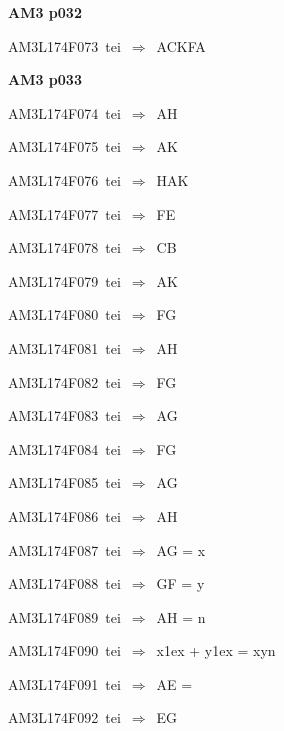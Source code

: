 \par\vfill\eject
{\bf\hfill AM3 p032\hfill\hbox{}}\par\bigskip
{\sixrm AM3L174F073\ {\sixit tei}\ }$\Rightarrow$\ ACKFA\par\smallskip

\par\vfill\eject
{\bf\hfill AM3 p033\hfill\hbox{}}\par\bigskip
{\sixrm AM3L174F074\ {\sixit tei}\ }$\Rightarrow$\ AH\par\smallskip
{\sixrm AM3L174F075\ {\sixit tei}\ }$\Rightarrow$\ AK\par\smallskip
{\sixrm AM3L174F076\ {\sixit tei}\ }$\Rightarrow$\ HAK\par\smallskip
{\sixrm AM3L174F077\ {\sixit tei}\ }$\Rightarrow$\ FE\par\smallskip
{\sixrm AM3L174F078\ {\sixit tei}\ }$\Rightarrow$\ CB\par\smallskip
{\sixrm AM3L174F079\ {\sixit tei}\ }$\Rightarrow$\ AK\par\smallskip
{\sixrm AM3L174F080\ {\sixit tei}\ }$\Rightarrow$\ FG\par\smallskip
{\sixrm AM3L174F081\ {\sixit tei}\ }$\Rightarrow$\ AH\par\smallskip
{\sixrm AM3L174F082\ {\sixit tei}\ }$\Rightarrow$\ FG\par\smallskip
{\sixrm AM3L174F083\ {\sixit tei}\ }$\Rightarrow$\ AG\par\smallskip
{\sixrm AM3L174F084\ {\sixit tei}\ }$\Rightarrow$\ FG\par\smallskip
{\sixrm AM3L174F085\ {\sixit tei}\ }$\Rightarrow$\ AG\par\smallskip
{\sixrm AM3L174F086\ {\sixit tei}\ }$\Rightarrow$\ AH\par\smallskip
{\sixrm AM3L174F087\ {\sixit tei}\ }$\Rightarrow$\ AG = x\par\smallskip
{\sixrm AM3L174F088\ {\sixit tei}\ }$\Rightarrow$\ GF = y\par\smallskip
{\sixrm AM3L174F089\ {\sixit tei}\ }$\Rightarrow$\ AH = {\tenit n}\par\smallskip
{\sixrm AM3L174F090\ {\sixit tei}\ }$\Rightarrow$\ {\tenit x}\raise1ex\hbox{} + {\tenit y}\raise1ex\hbox{} = {\tenit xyn}\par\smallskip
{\sixrm AM3L174F091\ {\sixit tei}\ }$\Rightarrow$\ AE =\par\smallskip
{\sixrm AM3L174F092\ {\sixit tei}\ }$\Rightarrow$\ EG\par\smallskip
